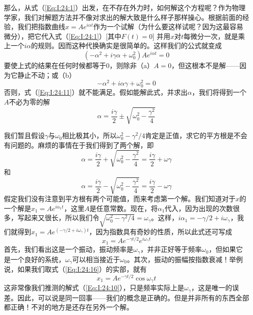 那么，从式（\ref{Eq:I:24:1}）出发，在不存在外力时，如何解这个方程呢？作为物理学家，我们对解题方法并不像对求出的解大致是什么样子那样操心。根据前面的经验，我们把指数曲线$x=Ae^{i\alpha t}$作为一个试解（为什么要这样试呢？因为这最容易微分），把它代入式（\ref{Eq:I:24:1}）[其中$F(t)=0$] 并用$x$对$t$每微分一次，就是乘上一个$i\alpha$的规则。因而这种代换确实是很简单的。这样我们的公式就变成
\begin{equation}
    \label{Eq:I:24:11}
    (-\alpha^2 + i\gamma\alpha + \omega_0^2)Ae^{i\alpha t} = 0
\end{equation}
要使上式的结果在任何时候都等于0，则除非（a）$A=0$，但这根本不是解——因为它静止不动；或（b）
\begin{equation}
    \label{Eq:I:24:12}
    -\alpha^2 + i\alpha\gamma + \omega_0^2 = 0
\end{equation}
否则，式（\ref{Eq:I:24:11}）就不能满足。假如能解此式，并求出$\alpha$，我们将得到一个$A$不必为零的解
\begin{equation}
    \label{Eq:I:24:13}
    \alpha = \frac{i\gamma}{2} \pm \sqrt{\omega_0^2 - \frac{\gamma^2}{4}}
\end{equation}

我们暂且假设$\gamma$与$\omega_0$相比极其小，所以$\omega_0^2 - \gamma^2/4$肯定是正值，求它的平方根是不会有问题的。麻烦的事情在于我们得到了两个解，即
\begin{equation}
    \label{Eq:I:24:14}
    \alpha = \frac{i\gamma}{2} + \sqrt{\omega_0^2 - \frac{\gamma^2}{4}} = \frac{i\gamma}{2} + \omega\gamma
\end{equation}
和
\begin{equation}
    \label{Eq:I:24:15}
    \alpha = \frac{i\gamma}{2} - \sqrt{\omega_0^2 - \frac{\gamma^2}{4}} = \frac{i\gamma}{2} - \omega\gamma
\end{equation}
假定我们没有注意到平方根有两个可能值，而来考虑第一个解。我们知道对于$x$的一个解是$x_1=Ae^{i\alpha_1t}$，这里$A$是任意常数。现在，将$\alpha_1$代入，因为出现的次数很多，写起来又很长，所以我们令$\sqrt{\omega_0^2 - \gamma^2/4}=\omega_\gamma$。这样，$i\alpha_1 = -\gamma/2 + i\omega_\gamma$，我们就得到$x_1 = Ae^{(-\gamma/2 + i\omega_\gamma)t}$，因为指数具有奇妙的性质，所以此式还可写成
\begin{equation}
    \label{Eq:I:24:16}
    x_1 = Ae^{-\gamma t/2}e^{i\omega_\gamma t}
\end{equation}
首先，我们看出这是一个振动，振动频率是$\omega_\gamma$，并非正好等于频率$\omega_0$，但如果它是一个良好的系统，$\omega_\gamma$可以相当接近于$\omega_0$。其次，振动的振幅按指数衰减！举例说，如果我们取式（\ref{Eq:I:24:16}）的实部，就有
\begin{equation}
    \label{Eq:I:24:17}
    x_1 = Ae^{-\gamma t/2}\cos\omega_\gamma t
\end{equation}
这非常像我们推测的解式（\ref{Eq:I:24:10}），只是频率实际上是$\omega_\gamma$，这是唯一的误差。因此，可以说是同一回事——我们的概念是正确的。但是并非所有的东西全部都正确！不对的地方是还存在另外一个解。

